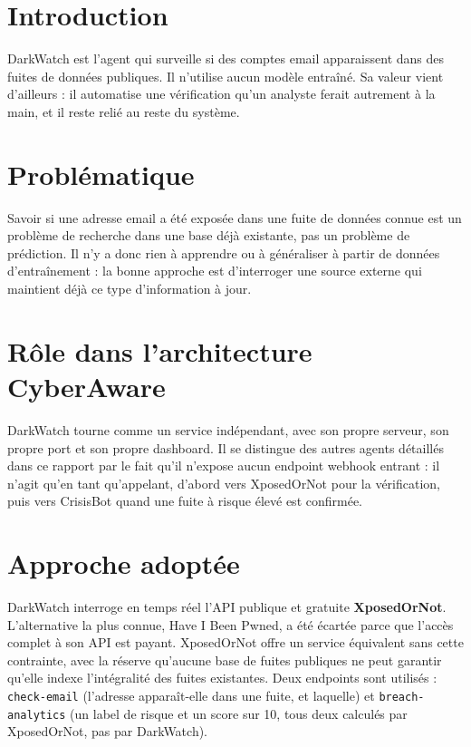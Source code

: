 \documentclass[12pt,a4paper]{report}
\begin{document}
\section{Introduction}

DarkWatch est l'agent qui surveille si des comptes email apparaissent dans des fuites de données publiques. Il n'utilise aucun modèle entraîné. Sa valeur vient d'ailleurs : il automatise une vérification qu'un analyste ferait autrement à la main, et il reste relié au reste du système.

\section{Problématique}

Savoir si une adresse email a été exposée dans une fuite de données connue est un problème de recherche dans une base déjà existante, pas un problème de prédiction. Il n'y a donc rien à apprendre ou à généraliser à partir de données d'entraînement : la bonne approche est d'interroger une source externe qui maintient déjà ce type d'information à jour.

\section{Rôle dans l'architecture CyberAware}

DarkWatch tourne comme un service indépendant, avec son propre serveur, son propre port et son propre dashboard. Il se distingue des autres agents détaillés dans ce rapport par le fait qu'il n'expose aucun endpoint webhook entrant : il n'agit qu'en tant qu'appelant, d'abord vers XposedOrNot pour la vérification, puis vers CrisisBot quand une fuite à risque élevé est confirmée.

\section{Approche adoptée}

DarkWatch interroge en temps réel l'API publique et gratuite \textbf{XposedOrNot}. L'alternative la plus connue, Have I Been Pwned, a été écartée parce que l'accès complet à son API est payant. XposedOrNot offre un service équivalent sans cette contrainte, avec la réserve qu'aucune base de fuites publiques ne peut garantir qu'elle indexe l'intégralité des fuites existantes. Deux endpoints sont utilisés : \texttt{check-email} (l'adresse apparaît-elle dans une fuite, et laquelle) et \texttt{breach-analytics} (un label de risque et un score sur 10, tous deux calculés par XposedOrNot, pas par DarkWatch).
\end{document}
